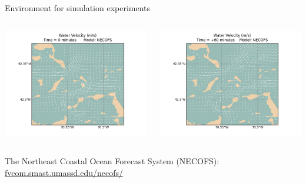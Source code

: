 \documentclass[9pt,xcolor=table]{beamer}
\begin{document}
\begin{frame}{Environment for simulation experiments}
\begin{columns}
\begin{column}{0.5\textwidth}
            \includegraphics[width=\textwidth,trim={0cm 0cm 0cm 0cm},clip]{img/full_water_1.png}
        \end{column}
        \begin{column}{0.5\textwidth}
            \includegraphics[width=\textwidth,trim={0cm 0cm 0cm 0cm},clip]{img/full_water_2.png}
        \end{column}
    \end{columns}
    {\tiny The Northeast Coastal Ocean Forecast System (NECOFS): 
    \url{fvcom.smast.umassd.edu/necofs/}}
\end{frame}
\end{document}

